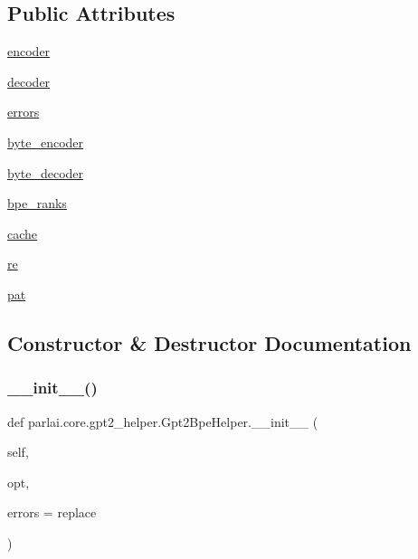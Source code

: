 \subsection*{Public Attributes}
\begin{DoxyCompactItemize}
\item 
\hyperlink{classparlai_1_1core_1_1gpt2__helper_1_1Gpt2BpeHelper_a794ff2b9372acac9ab7c80b5c07ab60b}{encoder}
\item 
\hyperlink{classparlai_1_1core_1_1gpt2__helper_1_1Gpt2BpeHelper_a26ab20eb1b181e46035f2164513d8fce}{decoder}
\item 
\hyperlink{classparlai_1_1core_1_1gpt2__helper_1_1Gpt2BpeHelper_a0ea9f7588f25a62eb6021a54ea8ca095}{errors}
\item 
\hyperlink{classparlai_1_1core_1_1gpt2__helper_1_1Gpt2BpeHelper_aa05888129c3d12eec57bc03e92390e4c}{byte\+\_\+encoder}
\item 
\hyperlink{classparlai_1_1core_1_1gpt2__helper_1_1Gpt2BpeHelper_aaa6f9b57563422f3651ee240013ae9f4}{byte\+\_\+decoder}
\item 
\hyperlink{classparlai_1_1core_1_1gpt2__helper_1_1Gpt2BpeHelper_a3138a0a7614de78ee773642fbe6ddaae}{bpe\+\_\+ranks}
\item 
\hyperlink{classparlai_1_1core_1_1gpt2__helper_1_1Gpt2BpeHelper_a9362e804fcdf0565a640996285e85689}{cache}
\item 
\hyperlink{classparlai_1_1core_1_1gpt2__helper_1_1Gpt2BpeHelper_ac1ad446c51c26831655244d83350589a}{re}
\item 
\hyperlink{classparlai_1_1core_1_1gpt2__helper_1_1Gpt2BpeHelper_afbdbf5259b69f21f389eecaaada838d8}{pat}
\end{DoxyCompactItemize}


\subsection{Constructor \& Destructor Documentation}
\mbox{\label{classparlai_1_1core_1_1gpt2__helper_1_1Gpt2BpeHelper_a5c9324bab66b00f6f977aef0241927bd}} 
\subsubsection{\texorpdfstring{\+\_\+\+\_\+init\+\_\+\+\_\+()}{\_\_init\_\_()}}
{\footnotesize\ttfamily def parlai.\+core.\+gpt2\+\_\+helper.\+Gpt2\+Bpe\+Helper.\+\_\+\+\_\+init\+\_\+\+\_\+ (\begin{DoxyParamCaption}\item[{}]{self,  }\item[{}]{opt,  }\item[{}]{errors = {\ttfamily \textquotesingle{}replace\textquotesingle{}} }\end{DoxyParamCaption})}



